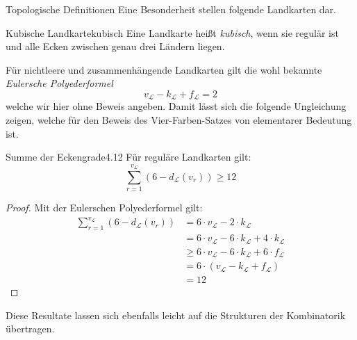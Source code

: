 \begin{section}{Topologische Definitionen}
 Eine Besonderheit stellen folgende Landkarten dar.
 
 \begin{definitionl}{Kubische Landkarte}{kubisch}
  Eine Landkarte heißt \textit{kubisch}, wenn sie regulär ist und alle Ecken zwischen genau drei Ländern liegen.
 \end{definitionl}

 Für nichtleere und zusammenhängende Landkarten gilt die wohl bekannte \textit{Eulersche Polyederformel}
 \[v_\mathcal{L} - k_\mathcal{L} + f_\mathcal{L} = 2\]
 welche wir hier ohne Beweis angeben. Damit lässt sich die folgende Ungleichung zeigen, welche für den Beweis des Vier-Farben-Satzes von elementarer Bedeutung ist.
 
 \begin{satzl}{Summe der Eckengrade}{4.12}
  Für reguläre Landkarten gilt: \[\sum_{r=1}^{v_\mathcal{L}} (6-d_\mathcal{L}(v_r)) \geq 12\]
 \end{satzl}
 \begin{proof}
  Mit der Eulerschen Polyederformel gilt:
  \begin{align*}
    \sum_{r=1}^{v_\mathcal{L}} (6-d_\mathcal{L}(v_r)) &= 6\cdot v_\mathcal{L}-2\cdot k_\mathcal{L}\\
    &= 6\cdot v_\mathcal{L} - 6\cdot k_\mathcal{L} + 4\cdot k_\mathcal{L}\\
    &\geq 6\cdot v_\mathcal{L} - 6\cdot k_\mathcal{L} + 6\cdot f_\mathcal{L}\\
    &= 6\cdot (v_\mathcal{L} - k_\mathcal{L} + f_\mathcal{L})\\
    &= 12
  \end{align*}
 \end{proof}

 Diese Resultate lassen sich ebenfalls leicht auf die Strukturen der Kombinatorik übertragen.

\end{section}